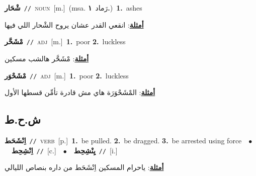 \documentclass[10pt,a4paper,twoside]{article} %
\begin{document}
\begin{multicols}{2}
{\setlength\topsep{0pt}\textbf{\foreignlanguage{arabic}{شْحَار}}\ {\color{gray}\texttt{//}\color{black}}\ \textsc{noun}\ [m.]\ \color{gray}(msa. \foreignlanguage{arabic}{رَماد}~\foreignlanguage{arabic}{\textbf{١.}})\color{black}\ \textbf{1.}~ashes\  \begin{flushright}\color{gray}\foreignlanguage{arabic}{\textbf{\underline{\foreignlanguage{arabic}{أمثلة}}}: انقعي القدر عشان يروح الشْحار اللي فيها}\end{flushright}\color{black}} \vspace{2mm}

{\setlength\topsep{0pt}\textbf{\foreignlanguage{arabic}{مْشَحَّر}}\ {\color{gray}\texttt{//}\color{black}}\ \textsc{adj}\ [m.]\ \textbf{1.}~poor  \textbf{2.}~luckless\  \begin{flushright}\color{gray}\foreignlanguage{arabic}{\textbf{\underline{\foreignlanguage{arabic}{أمثلة}}}: مْشَحَّر هالشب مسكين}\end{flushright}\color{black}} \vspace{2mm}

{\setlength\topsep{0pt}\textbf{\foreignlanguage{arabic}{مْشَحْوَر}}\ {\color{gray}\texttt{//}\color{black}}\ \textsc{adj}\ [m.]\ \textbf{1.}~poor  \textbf{2.}~luckless\  \begin{flushright}\color{gray}\foreignlanguage{arabic}{\textbf{\underline{\foreignlanguage{arabic}{أمثلة}}}: المْشَحْوَرَة هاي مش قادرة تأمِّن قسطها الأول}\end{flushright}\color{black}} \vspace{2mm}

\vspace{-3mm}
\subsection*{\color{blue}\foreignlanguage{arabic}{ش.ح.ط}\color{blue}{}} 

{\setlength\topsep{0pt}\textbf{\foreignlanguage{arabic}{اِنْشَحَط}}\ {\color{gray}\texttt{//}\color{black}}\ \textsc{verb}\ [p.]\ \textbf{1.}~be pulled.  \textbf{2.}~be dragged.  \textbf{3.}~be arrested using force\ \ $\bullet$\ \ \setlength\topsep{0pt}\textbf{\foreignlanguage{arabic}{اِنْشِحِط}}\ {\color{gray}\texttt{//}\color{black}}\ [c.]\ \ $\bullet$\ \ \setlength\topsep{0pt}\textbf{\foreignlanguage{arabic}{يِنْشِحِط}}\ {\color{gray}\texttt{//}\color{black}}\ [i.]\  \begin{flushright}\color{gray}\foreignlanguage{arabic}{\textbf{\underline{\foreignlanguage{arabic}{أمثلة}}}: ياحرام المسكين اِنْشَحَط من داره بنصاص الليالي}\end{flushright}\color{black}} \vspace{2mm}


\end{multicols}
\end{document}
